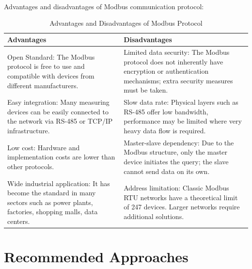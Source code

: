     Advantages and disadvantages of Modbus communication protocol:
    \begin{table}[htbp]
        \centering
        \caption{Advantages and Disadvantages of Modbus Protocol}
        \begin{tabular}{|p{7cm}|p{7cm}|}
        \hline
        \textbf{Advantages} & \textbf{Disadvantages} \\
        \hline
        Open Standard: The Modbus protocol is free to use and compatible with devices from different manufacturers. &
        Limited data security: The Modbus protocol does not inherently have encryption or authentication mechanisms; extra security measures must be taken. \\
        \hline
        Easy integration: Many measuring devices can be easily connected to the network via RS-485 or TCP/IP infrastructure. &
        Slow data rate: Physical layers such as RS-485 offer low bandwidth, performance may be limited where very heavy data flow is required. \\
        \hline
        Low cost: Hardware and implementation costs are lower than other protocols. &
        Master-slave dependency: Due to the Modbus structure, only the master device initiates the query; the slave cannot send data on its own. \\
        \hline
        Wide industrial application: It has become the standard in many sectors such as power plants, factories, shopping malls, data centers. &
        Address limitation: Classic Modbus RTU networks have a theoretical limit of 247 devices. Larger networks require additional solutions. \\
        \hline
        \end{tabular}
        \label{tab:modbus_comparison}
        \end{table}
        



\section{Recommended Approaches}

